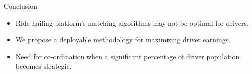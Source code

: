 
\begin{frame}{Conclusion}
\begin{itemize}
	\item Ride-hailing platform's matching algorithms may not be optimal for drivers.
	\item We propose a deployable methodology for maximizing driver earnings.
	\pause
	\vspace{1cm}
	\item \alert{Need for co-ordination when a significant percentage of driver population becomes strategic.}
\end{itemize}
\end{frame}